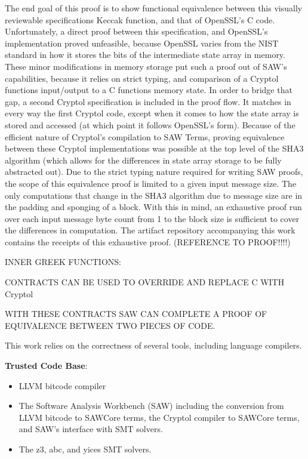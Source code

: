 The end goal of this proof is to show functional equivalence between this visually reviewable specifications Keccak function, and that of OpenSSL's C code.
Unfortunately, a direct proof between this specification, and OpenSSL's implementation proved unfeasible, because OpenSSL varies from the NIST standard in how it stores the bits of the intermediate state array in memory.
These minor modifications in memory storage put such a proof out of SAW's capabilities, because it relies on strict typing, and comparison of a Cryptol functions input/output to a C functions memory state.
In order to bridge that gap, a second Cryptol specification is included in the proof flow.
It matches in every way the first Cryptol code, except when it comes to how the state array is stored and accessed (at which point it follows OpenSSL's form).
Because of the efficient nature of Cryptol's compilation to SAW Terms, proving equivalence between these Cryptol implementations was possible at the top level of the SHA3 algorithm (which allows for the differences in state array storage to be fully abstracted out).
Due to the strict typing nature required for writing SAW proofs, the scope of this equivalence proof is limited to a given input message size.
The only computations that change in the SHA3 algorithm due to message size are in the padding and sponging of a block.
With this in mind, an exhaustive proof run over each input message byte count from 1 to the block size is sufficient to cover the differences in computation.
The artifact repository accompanying this work contains the receipts of this exhaustive proof. (REFERENCE TO PROOF!!!!)

INNER GREEK FUNCTIONS:

CONTRACTS CAN BE USED TO OVERRIDE AND REPLACE C WITH Cryptol

WITH THESE CONTRACTS SAW CAN COMPLETE A PROOF OF EQUIVALENCE BETWEEN TWO PIECES OF CODE.

This work relies on the correctness of several tools, including language compilers. 

\noindent \textbf{Trusted Code Base}:
\begin{itemize}
  \item LLVM bitcode compiler
  \item The Software Analysis Workbench (SAW) including the conversion from LLVM bitcode to SAWCore terms, the Cryptol compiler to SAWCore terms, and SAW's interface with SMT solvers.
  \item The z3, abc, and yices SMT solvers.
\end{itemize}

